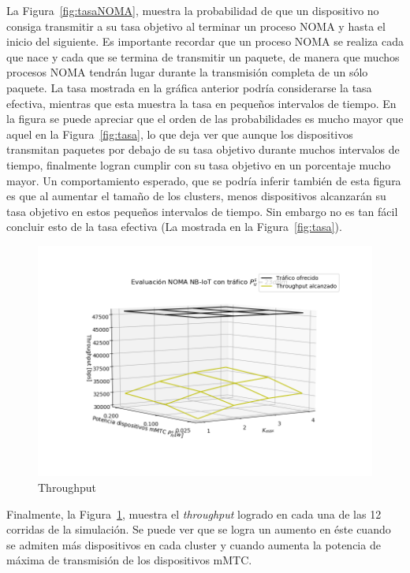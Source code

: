La Figura~\ref{fig:tasaNOMA}, muestra la probabilidad de que un dispositivo no consiga transmitir a su tasa objetivo al terminar un proceso NOMA y hasta el inicio del siguiente. Es importante recordar que un proceso NOMA se realiza cada que nace y cada que se termina de transmitir un paquete, de manera que muchos procesos NOMA tendrán lugar durante la transmisión completa de un sólo paquete. La tasa mostrada en la gráfica anterior podría considerarse la tasa efectiva, mientras que esta muestra la tasa en pequeños intervalos de tiempo. En la figura se puede apreciar que el orden de las probabilidades es mucho mayor que aquel en la Figura~\ref{fig:tasa}, lo que deja ver que aunque los dispositivos transmitan paquetes por debajo de su tasa objetivo durante muchos intervalos de tiempo, finalmente logran cumplir con su tasa objetivo en un porcentaje mucho mayor. Un comportamiento esperado, que se podría inferir también de esta figura es que al aumentar el tamaño de los clusters, menos dispositivos alcanzarán su tasa objetivo en estos pequeños intervalos de tiempo. Sin embargo no es tan fácil concluir esto de la tasa efectiva (La mostrada en la Figura~\ref{fig:tasa}).\newline

\begin{figure}[th]
    \centering
    \includegraphics[scale=0.9]{Figures/ResultadosTrafico/Figure_4.png}
    \decoRule
    \caption[Throughput]{Throughput}
    \label{fig:throughput2}
\end{figure}

Finalmente, la Figura~\ref{fig:throughput2}, muestra el \textit{throughput} logrado en cada una de las 12 corridas de la simulación. Se puede ver que se logra un aumento en éste cuando se admiten más dispositivos en cada cluster y cuando aumenta la potencia de máxima de transmisión de los dispositivos mMTC.\newline 

